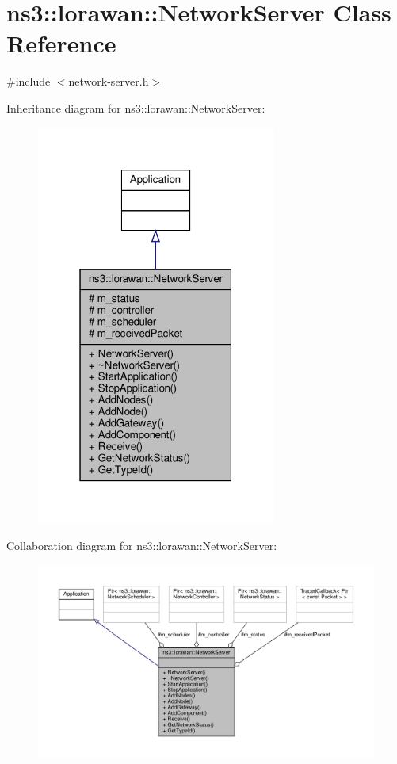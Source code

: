 \hypertarget{classns3_1_1lorawan_1_1NetworkServer}{}\section{ns3\+:\+:lorawan\+:\+:Network\+Server Class Reference}
\label{classns3_1_1lorawan_1_1NetworkServer}


{\ttfamily \#include $<$network-\/server.\+h$>$}



Inheritance diagram for ns3\+:\+:lorawan\+:\+:Network\+Server\+:
\nopagebreak
\begin{figure}[H]
\begin{center}
\leavevmode
\includegraphics[width=223pt]{classns3_1_1lorawan_1_1NetworkServer__inherit__graph}
\end{center}
\end{figure}


Collaboration diagram for ns3\+:\+:lorawan\+:\+:Network\+Server\+:
\nopagebreak
\begin{figure}[H]
\begin{center}
\leavevmode
\includegraphics[width=350pt]{classns3_1_1lorawan_1_1NetworkServer__coll__graph}
\end{center}
\end{figure}
